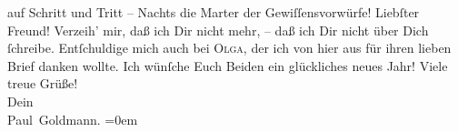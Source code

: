 \begin{ledgroupsized}[t]{13cm}
               auf Schritt und Tritt – Nachts die Marter {\pb}der
               Gewiſſensvorwürfe!\pend
           \pstart
           Liebſter Freund! Verzeih’ mir, daß ich Dir nicht mehr, – daß ich Dir nicht über Dich
               ſchreibe. Entſchuldige mich auch bei \textsc{Olga}, der ich von hier aus für
               ihren lieben Brief danken wollte.\pend
           \pstart
           Ich wünſche Euch Beiden ein glückliches neues Jahr!\pend
           \pstart
           Viele treue Grüße! {\\[\baselineskip]}Dein {\\[\baselineskip]}\spacefill\mbox{Paul Goldmann.}\pend
           \leftskip=0em{}
         
         \endnumbering{}\end{ledgroupsized}  \newcommand{\dateiname}{L03231}\newcommand{\titel}{Paul Goldmann an Arthur Schnitzler, 28. 12. [1902]}\newcommand{\editorInnen}{Martin Anton Müller und Laura Untner}
      